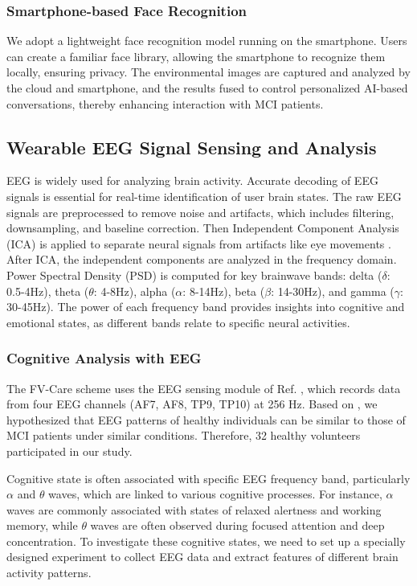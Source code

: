 \documentclass[conference]{IEEEtran}
\begin{document}
\subsubsection{Smartphone-based Face Recognition}
We adopt a lightweight face recognition model running on the smartphone\cite{FaceRecogAndroid}. Users can create a familiar face library, allowing the smartphone to recognize them locally, ensuring privacy. The environmental images are captured and analyzed by the cloud and smartphone, and the results fused to control personalized AI-based conversations, thereby enhancing interaction with MCI patients.

\subsection{Wearable EEG Signal Sensing and Analysis}

EEG is widely used for analyzing brain activity. Accurate decoding of EEG signals is essential for real-time identification of user brain states. The raw EEG signals are preprocessed to remove noise and artifacts, which includes filtering, downsampling, and baseline correction. Then Independent Component Analysis (ICA) is applied to separate neural signals from artifacts like eye movements \cite{makeig1996independent}.
After ICA, the independent components are analyzed in the frequency domain. Power Spectral Density (PSD) is computed for key brainwave bands: delta ($\delta$: 0.5-4Hz), theta ($\theta$: 4-8Hz), alpha ($\alpha$: 8-14Hz), beta ($\beta$: 14-30Hz), and gamma ($\gamma$: 30-45Hz). The power of each frequency band provides insights into cognitive and emotional states, as different bands relate to specific neural activities.



\subsubsection{Cognitive Analysis with EEG}

The FV-Care scheme uses the EEG sensing module of Ref. \cite{muse}, which records data from four EEG channels (AF7, AF8, TP9, TP10) at 256 Hz. Based on \cite{schumacher2020quantitative}, we hypothesized that EEG patterns of healthy individuals can be similar to those of MCI patients under similar conditions. Therefore, 32 healthy volunteers participated in our study. 


Cognitive state is often associated with specific EEG frequency band, particularly $\alpha$ and $\theta$ waves, which are linked to various cognitive processes. For instance, $\alpha$ waves are commonly associated with states of relaxed alertness and working memory, while $\theta$ waves are often observed during focused attention and deep concentration. To investigate these cognitive states, we need to set up a specially designed experiment to collect EEG data and extract features of different brain activity patterns. 
\end{document}
